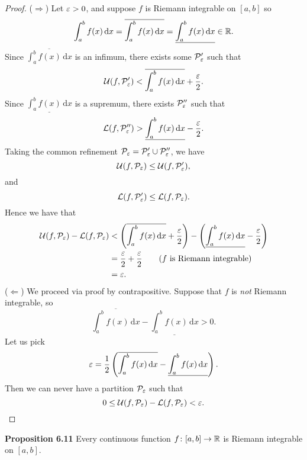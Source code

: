 \documentclass[class=article, crop=false]{standalone}
\begin{document}
  \begin{proof}
    ($\Rightarrow$) Let $\varepsilon > 0$, and suppose $f$ is Riemann integrable on $[a, b]$ so
    \[
      \int_{a}^{b}f(x) \,\mathrm dx = \overline{\int_{a}^{b}f(x) \,\mathrm dx} = \underline{\int_{a}^{b}f(x) \,\mathrm dx}\in\mathbb{R}.
    \]
    Since $\overline{\int_{a}^{b}f(x) \,\mathrm dx}$ is an infimum, there exists some $\mathcal{P}_{\varepsilon}'$ such that
    \[
      \mathcal{U}(f, \mathcal{P}_{\varepsilon}') < \overline{\int_{a}^{b}f(x) \,\mathrm dx} + \frac{\varepsilon}{2}.
    \]
    Since $\underline{\int_{a}^{b}f(x) \,\mathrm dx}$ is a supremum, there exists $\mathcal{P}_{\varepsilon}''$ such that
    \[
      \mathcal{L}(f, \mathcal{P}_{\varepsilon}'') > \underline{\int_{a}^{b}f(x) \,\mathrm dx} - \frac{\varepsilon}{2}.
    \]
    Taking the common refinement $\mathcal{P}_{\varepsilon} = \mathcal{P}_{\varepsilon}' \cup \mathcal{P}_{\varepsilon}''$, we have
    \[
      \mathcal{U}(f, \mathcal{P}_{\varepsilon})\leq \mathcal{U}(f, \mathcal{P}_{\varepsilon}'),
    \]
    and
    \[
      \mathcal{L}(f, \mathcal{P}_{\varepsilon}')\leq \mathcal{L}(f, \mathcal{P}_{\varepsilon}).
    \]
    Hence we have that
    \begin{align*}
      \mathcal{U}(f, \mathcal{P}_{\varepsilon}) - \mathcal{L}(f, \mathcal{P}_{\varepsilon}) &< \left( \overline{\int_{a}^{b}f(x) \,\mathrm dx} + \frac{\varepsilon}{2} \right) - \left( \underline{\int_{a}^{b}f(x) \,\mathrm dx} - \frac{\varepsilon}{2} \right) \\
                                                                          &= \frac{\varepsilon}{2} + \frac{\varepsilon}{2} \tag{$f$ is Riemann integrable}\\
                                                                          &= \varepsilon.
    \end{align*}
    ($\Leftarrow$) We proceed via proof by contrapositive. Suppose that $f$ is \emph{not} Riemann integrable, so
    \[
      \overline{\int_{a}^{b}f(x) \,\mathrm dx} - \underline{\int_{a}^{b}f(x) \,\mathrm dx} > 0.
    \]
    Let us pick
    \[
      \varepsilon = \frac{1}{2}\left( \overline{\int_{a}^{b}f(x) \,\mathrm dx} - \underline{\int_{a}^{b}f(x) \,\mathrm dx} \right).
    \]
    Then we can never have a partition $\mathcal{P}_{\varepsilon}$ such that
    \[
      0\leq \mathcal{U}(f, \mathcal{P}_{\varepsilon}) - \mathcal{L}(f, \mathcal{P}_{\varepsilon}) < \varepsilon.
    \]
  \end{proof}
  \textbf{Proposition 6.11} Every continuous function $f\colon [a, b]\to \mathbb{R}$ is Riemann integrable on $[a, b]$.
\end{document}

